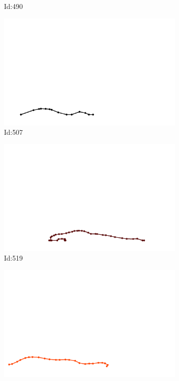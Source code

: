 \documentclass[12pt,twoside]{report}
\begin{document}
\begin{figure}
\begin{subfigure}[b]{0.20\textwidth}
\caption{Id:490}
\end{subfigure}
\begin{subfigure}[b]{0.20\textwidth}
\centering
\includegraphics[width=\textwidth]{../trajectories/507.png}
\caption{Id:507}
\end{subfigure}
\begin{subfigure}[b]{0.20\textwidth}
\centering
\includegraphics[width=\textwidth]{../trajectories/519.png}
\caption{Id:519}
\end{subfigure}
\begin{subfigure}[b]{0.20\textwidth}
\centering
\includegraphics[width=\textwidth]{../trajectories/576.png}

\end{subfigure}
\end{figure}
\end{document}
